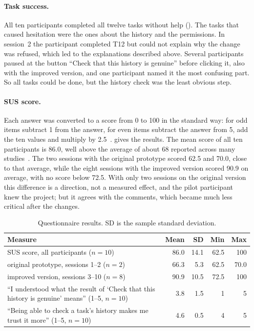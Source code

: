 \paragraph*{Task success.} All ten participants completed all twelve tasks without help (). The tasks that caused hesitation were the ones about the history and the permissions. In session~2 the participant completed T12 but could not explain why the change was refused, which led to the explanations described above. Several participants paused at the button ``Check that this history is genuine'' before clicking it, also with the improved version, and one participant named it the most confusing part. So all tasks could be done, but the history check was the least obvious step.

\paragraph*{SUS score.} Each answer was converted to a score from 0 to 100 in the standard way: for odd items subtract 1 from the answer, for even items subtract the answer from 5, add the ten values and multiply by 2.5~\cite{brooke1996sus}.  gives the results. The mean score of all ten participants is 86.0, well above the average of about 68 reported across many studies~\cite{lewis2018sus}. The two sessions with the original prototype scored 62.5 and 70.0, close to that average, while the eight sessions with the improved version scored 90.9 on average, with no score below 72.5. With only two sessions on the original version this difference is a direction, not a measured effect, and the pilot participant knew the project; but it agrees with the comments, which became much less critical after the changes.

\begin{table}[tb]
    \centering
    \small
    \begin{tabular}{p{8.6cm}rrrr}
        \toprule
        Measure & Mean & SD & Min & Max \\
        \midrule
        SUS score, all participants ($n=10$) & 86.0 & 14.1 & 62.5 & 100 \\
        \quad original prototype, sessions 1--2 ($n=2$) & 66.3 & 5.3 & 62.5 & 70.0 \\
        \quad improved version, sessions 3--10 ($n=8$) & 90.9 & 10.5 & 72.5 & 100 \\
        ``I understood what the result of `Check that this history is genuine' means'' (1--5, $n=10$) & 3.8 & 1.5 & 1 & 5 \\
        ``Being able to check a task's history makes me trust it more'' (1--5, $n=10$) & 4.6 & 0.5 & 4 & 5 \\
        \bottomrule
    \end{tabular}
    \caption{Questionnaire results. SD is the sample standard deviation.}
    \label{tab:sus}
\end{table}

